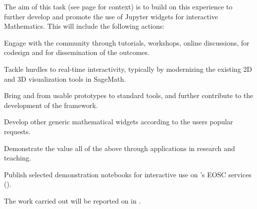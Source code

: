 \begin{task}[
  title=Demonstrator: Interactive Mathematics with Jupyter Widgets,
  id=math,
  lead=UPSUD,
  PM=15, %
  wphases={0-36!.5},
  partners={EGI,EP,QS}
  ]

  The aim of this task (see page
  \pageref{sec:concept-demonstrator-math} for context)
  is to build on this experience to further
  develop and promote the use of Jupyter widgets for interactive
  Mathematics. This will include the following actions:
  \begin{compactitem}
  \item Engage with the community through tutorials, workshops, online
    discussions, for codesign and for dissemination of the outcomes.
  \item Tackle hurdles to real-time interactivity, typically by
    modernizing the existing 2D and 3D visualization tools in
    SageMath. %
  \item Bring  and
     from usable prototypes to standard tools,
    and further contribute to the development of the 
    framework.
  \item Develop other generic mathematical widgets according to the
    users popular requests.
  \item Demonstrate the value all of the above through applications in
    research and teaching.
  \item Publish selected demonstration notebooks for interactive use on
    \TheProject's EOSC services ().
  \end{compactitem}
  The work carried out will be reported on in
  .
\end{task}
